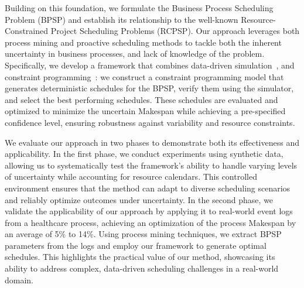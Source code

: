 Building on this foundation, we formulate the Business Process Scheduling Problem (BPSP) and establish its relationship to the well-known Resource-Constrained Project Scheduling Problems (RCPSP). Our approach leverages both process mining and proactive scheduling methods to tackle both the inherent uncertainty in
business processes, and lack of knowledge of the problem. Specifically, we develop a framework that combines data-driven simulation~\cite{MeneghelloFGR25}, and constraint programming~\cite{kreter2018mixed}: we construct a constraint programming model that generates deterministic schedules for the BPSP, verify them using the simulator, and select the best performing schedules. These schedules are evaluated and optimized to minimize the uncertain Makespan while achieving a pre-specified confidence level, ensuring robustness against variability and resource constraints.

We evaluate our approach in two phases 
to demonstrate both its effectiveness and applicability. In the first phase, we conduct experiments using synthetic data, allowing us to systematically test the framework’s ability to handle varying levels of uncertainty while accounting for resource calendars. This controlled environment ensures that the method can adapt to diverse scheduling scenarios and reliably optimize outcomes under uncertainty. 
In the second phase, we validate the applicability of our approach by applying it to real-world event logs from a healthcare process, achieving an optimization of the process Makespan by an average of 5\% to 14\%.
Using process mining techniques, we extract BPSP parameters from the logs and employ our framework to generate optimal schedules. This highlights the practical value of our method, showcasing its ability to address complex, data-driven scheduling challenges in a real-world domain.


